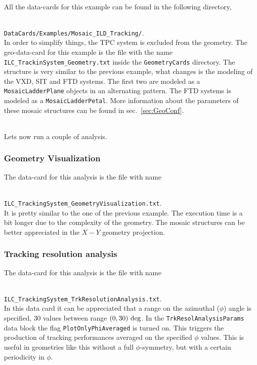 ~\\
\noindent
All the data-cards for this example can be found in the following directory,

~\\
{\small {\tt DataCards/Examples/Mosaic\_ILD\_Tracking/}}.
~\\

\noindent
In order to simplify things, the TPC system is excluded from the geometry. The geo-data-card for this example is the file with the name {\tt ILC\_TrackinSystem\_Geometry.txt} 
inside the {\tt GeometryCards} directory. The structure is very similar to the previous example, what changes is the modeling of the VXD, SIT and FTD systems. The first two are 
modeled as a {\tt MosaicLadderPlane} objects in an alternating pattern. The FTD systems is modeled as a {\tt MosaicLadderPetal}. More information about the parameters of these 
mosaic structures can be found in sec.~\ref{sec:GeoConf}.

~\\
\noindent
Lets now run a couple of analysis.

\subsubsection*{Geometry Visualization}

The data-card for this analysis is the file with name

~\\
{\small {\tt ILC\_TrackingSystem\_GeometryVisualization.txt}}.
~\\

\noindent
It is pretty similar to the one of the previous example. The execution time is a bit longer due to the complexity of the geometry. The mosaic structures can be better appreciated in the 
$X-Y$ geometry projection.

\subsubsection*{Tracking resolution analysis}

The data-card for this analysis is the file with name

~\\
{\small {\tt ILC\_TrackingSystem\_TrkResolutionAnalysis.txt}}.
~\\

\noindent
In this data card it can be appreciated that a range on the azimuthal ($\phi$) angle is specified, 30 values between range $(0,30)~{\rm deg}$. In the {\tt TrkResolAnalysisParams} data block 
the flag {\tt PlotOnlyPhiAveraged} is turned on. This triggers the production of tracking performances averaged on the specified $\phi$ values. This is useful in geometries like this without 
a full $\phi$-symmetry, but with a certain periodicity in $\phi$.


